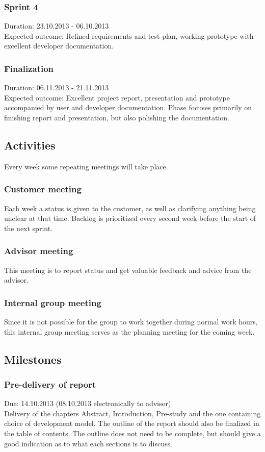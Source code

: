 \documentclass[11pt]{book}
\begin{document}
\subsubsection{Sprint 4}
Duration: 23.10.2013 - 06.10.2013\\
Expected outcome: Refined requirements and test plan, working prototype with excellent developer documentation.

\subsubsection{Finalization}
Duration: 06.11.2013 - 21.11.2013\\
Expected outcome: Excellent project report, presentation and prototype accompanied by user and developer documentation. Phase focuses primarily on finishing report and presentation, but also polishing the documentation.

\subsection{Activities}
Every week some repeating meetings will take place.

\subsubsection{Customer meeting}
Each week a status is given to the customer, as well as clarifying anything being unclear at that time. Backlog is prioritized every second week before the start of the next sprint.

\subsubsection{Advisor meeting}
This meeting is to report status and get valuable feedback and advice from the advisor.

\subsubsection{Internal group meeting}
Since it is not possible for the group to work together during normal work hours, this internal group meeting serves as the planning meeting for the coming week.

\subsection{Milestones}

\subsubsection{Pre-delivery of report}
Due: 14.10.2013 (08.10.2013 electronically to advisor)\\
Delivery of the chapters Abstract, Introduction, Pre-study and the one containing choice of development model. The outline of the report should also be finalized in the table of contents. The outline does not need to be complete, but should give a good indication as to what each sections is to discuss.
\end{document}
